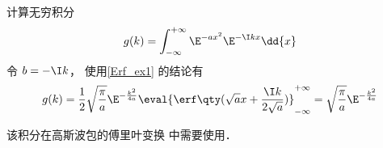 \begin{exam}{}
计算无穷积分
\begin{equation}
g(k) = \int_{-\infty}^{+\infty} \E^{-a x^2} \E^{-\I kx} \dd{x}
\end{equation}
令 $b = -\I k$， 使用\autoref{Erf_ex1} 的结论有
\begin{equation}
g(k) = \frac12 \sqrt{\frac{\pi}{a}} \E^{-\frac{k^2}{4a}} \eval{\erf\qty(\sqrt{a} x + \frac{\I k}{2\sqrt{a}})}_{-\infty}^{+\infty} = \sqrt{\frac{\pi}{a}} \E^{-\frac{k^2}{4a}}
\end{equation}

该积分在高斯波包的傅里叶变换%
中需要使用．
\end{exam}
